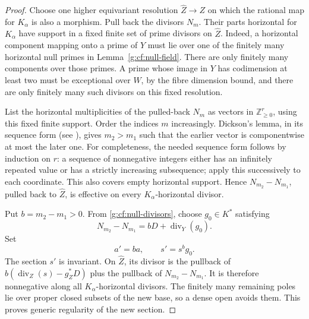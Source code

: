 \begin{proof}
Choose one higher equivariant resolution \(\widehat Z\to Z\) on
which the rational map for \(K_\alpha\) is also a morphism.  Pull back
the divisors \(N_m\).  Their parts horizontal for \(K_\alpha\) have
support in a fixed finite set of prime divisors on \(\widehat Z\).
Indeed, a horizontal component mapping onto a prime of \(Y\)
must lie over one of the finitely many horizontal null primes in
Lemma~\ref{g:cf:null-field}.  There are only finitely many components
over those primes.  A prime whose image in \(Y\) has codimension
at least two must be exceptional over \(W\), by the fibre dimension
bound, and there are only finitely many such divisors on this fixed
resolution.

List the horizontal multiplicities of the pulled-back \(N_m\) as
vectors in \(\mathbb Z_{\geq0}^r\), using this fixed finite support.
Order the indices \(m\) increasingly.  Dickson's lemma, in its sequence
form (see \cite[Theorem~1.1(1) and Lemma~3.2]{AichingerAichinger2018}), gives
\(m_2>m_1\) such that the earlier vector is componentwise at most
the later one.  For completeness, the needed sequence form follows
by induction on \(r\): a sequence of nonnegative integers either
has an infinitely repeated value or has a strictly increasing
subsequence; apply this successively to each coordinate.  This
also covers empty horizontal support.  Hence
\(N_{m_2}-N_{m_1}\), pulled back to \(\widehat Z\), is effective
on every \(K_\alpha\)-horizontal divisor.

Put \(b=m_2-m_1>0\).  From \eqref{g:cf:null-divisors}, choose
\(g_0\in K^*\) satisfying
\[
          N_{m_2}-N_{m_1}=bD+\operatorname{div}_Y(g_0).
\]
Set
\begin{equation}\label{g:cf:new-section}
                         a'=ba,\qquad s'=s^bg_0.
\end{equation}
The section \(s'\) is invariant.  On \(\widehat Z\), its divisor
is the pullback of \(b(\operatorname{div}_Z(s)-g_Z^*D)\) plus the pullback of
\(N_{m_2}-N_{m_1}\).  It is therefore nonnegative along all
\(K_\alpha\)-horizontal divisors.  The finitely many remaining poles
lie over proper closed subsets of the new base, so a dense open
avoids them.  This proves generic regularity of the new section.


\end{proof}
